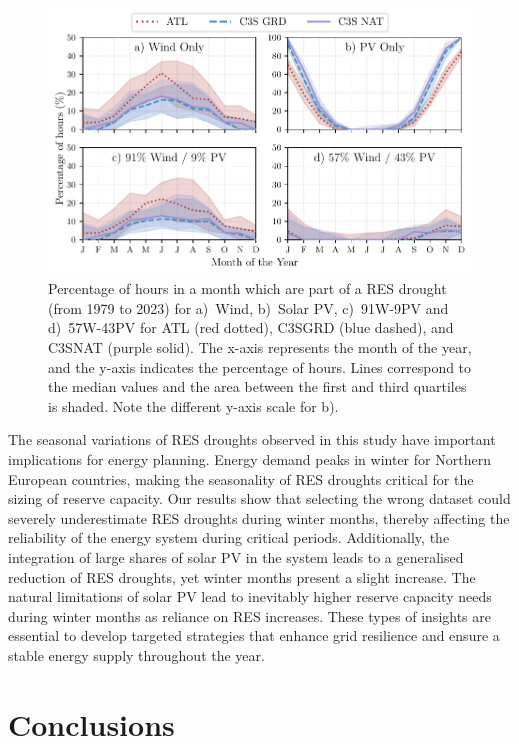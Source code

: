 \documentclass[preprint, 12pt]{elsarticle}
\providecommand{\DIFadd}[1]{{\protect\color{blue}\uwave{#1}}} %
\providecommand{\DIFaddFL}[1]{\DIFadd{#1}} %
\providecommand{\DIFaddbeginFL}{} %
\providecommand{\DIFaddendFL}{} %
\begin{document}
\begin{figure}[!ht]
	\centering
	\includegraphics[width=\textwidth]{droughts_seasonality.pdf}
	\caption{Percentage of hours in a month which are part of a RES drought (from 1979 to 2023) for a)~Wind, b)~Solar PV, c)~91W-9PV and d)~57W-43PV for ATL (red dotted), C3S\DIFaddbeginFL \DIFaddFL{~}\DIFaddendFL GRD (blue dashed), and C3S\DIFaddbeginFL \DIFaddFL{~}\DIFaddendFL NAT (purple solid). The x-axis represents the month of the year, and the y-axis indicates the percentage of hours. Lines correspond to the median values and the area between the first and third quartiles is shaded. Note the different y-axis scale for b).}
	\label{fig:res_droughts_seasonality}
\end{figure}

The seasonal variations of RES droughts observed in this study have important implications for energy planning. Energy demand peaks in winter for Northern European countries, making the seasonality of RES droughts critical for the sizing of reserve capacity. Our results show that selecting the wrong dataset could severely underestimate RES droughts during winter months, thereby affecting the reliability of the energy system during critical periods. Additionally, the integration of large shares of solar PV in the system leads to a generalised reduction of RES droughts, yet winter months present a slight increase. The natural limitations of solar PV lead to inevitably higher reserve capacity needs during winter months as reliance on RES increases. These types of insights are essential to develop targeted strategies that enhance grid resilience and ensure a stable energy supply throughout the year.


\section{Conclusions}
\label{sec:conclusions}
\end{document}
